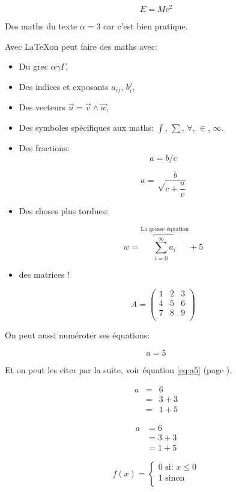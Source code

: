 \documentclass{article}
\begin{document}
$$
E = Mc^2
$$

Des maths du texte $\alpha = 3$ car c'est bien pratique.

Avec \LaTeX on peut faire des maths avec:
\begin{itemize}
\item Du grec $\alpha \gamma \Gamma$,
\item Des indices et exposants $a_{ij}$, $b_i^j$,
\item Des vecteurs $\vec u = \vec v \wedge \vec w$,
\item Des symboles spécifiques aux maths: $\int$, $\sum$, $\forall$, $\in$, $\infty$.
\item Des fractions:
$$
a = b/c
$$

$$
a = \sqrt\frac{b}{c + \dfrac{u}{v}}
$$
\item Des choses plus tordues:

$$
w = \overbrace{\sum_{i=0}^\infty a_i}^{\mbox{La grosse équation}}+ 5
$$ 

\item des matrices !

$$
A = \begin{pmatrix}
1 & 2 & 3 \\
4 & 5 & 6 \\
7 & 8 & 9 \\
\end{pmatrix}
$$
\end{itemize}

On peut aussi numéroter ses équations:

\begin{equation}
a = 5
\label{eq:a5}
\end{equation}

Et on peut les citer par la suite, voir équation \ref{eq:a5} (page \pageref{eq:a5}).


\begin{eqnarray}
a & = & 6 \nonumber \\ 
& = & 3 +  3 \nonumber \\ 
& = & 1 + 5 
\end{eqnarray}

\begin{align}
a & =  6 \\
& =  3 +  3 \\
& =  1 + 5 
\end{align}

\begin{equation}
f(x) = \left\lbrace\begin{split} 
0 \mbox{ si: } x \leq 0 \\
1 \mbox{ sinon}\\
\end{split} \right.
\end{equation}
\end{document}
